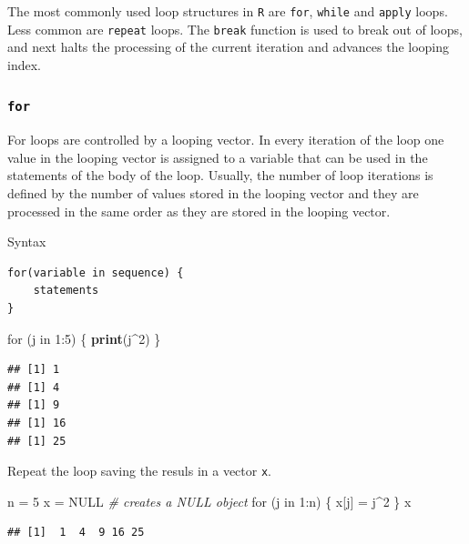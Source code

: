 \documentclass[]{article}
\newenvironment{Shaded}{\begin{snugshade}}{\end{snugshade}}
\newcommand{\KeywordTok}[1]{\textcolor[rgb]{0.13,0.29,0.53}{\textbf{{#1}}}}
\newcommand{\DecValTok}[1]{\textcolor[rgb]{0.00,0.00,0.81}{{#1}}}
\newcommand{\StringTok}[1]{\textcolor[rgb]{0.31,0.60,0.02}{{#1}}}
\newcommand{\CommentTok}[1]{\textcolor[rgb]{0.56,0.35,0.01}{\textit{{#1}}}}
\newcommand{\OtherTok}[1]{\textcolor[rgb]{0.56,0.35,0.01}{{#1}}}
\newcommand{\NormalTok}[1]{{#1}}
\numberwithin{equation}{section}
\begin{document}
The most commonly used loop structures in \texttt{R} are \texttt{for},
\texttt{while} and \texttt{apply} loops. Less common are \texttt{repeat}
loops. The \texttt{break} function is used to break out of loops, and
next halts the processing of the current iteration and advances the
looping index.

\subsubsection{\texorpdfstring{\texttt{for}}{for}}\label{for}

For loops are controlled by a looping vector. In every iteration of the
loop one value in the looping vector is assigned to a variable that can
be used in the statements of the body of the loop. Usually, the number
of loop iterations is defined by the number of values stored in the
looping vector and they are processed in the same order as they are
stored in the looping vector.

Syntax

\begin{verbatim}
for(variable in sequence) {
    statements
}
\end{verbatim}

\begin{Shaded}
\begin{Highlighting}[]
\NormalTok{for (j in }\DecValTok{1}\NormalTok{:}\DecValTok{5}\NormalTok{)}
\NormalTok{\{}
  \KeywordTok{print}\NormalTok{(j^}\DecValTok{2}\NormalTok{)}
\NormalTok{\}}
\end{Highlighting}
\end{Shaded}

\begin{verbatim}
## [1] 1
## [1] 4
## [1] 9
## [1] 16
## [1] 25
\end{verbatim}

Repeat the loop saving the resuls in a vector \texttt{x}.

\begin{Shaded}
\begin{Highlighting}[]
\NormalTok{n =}\StringTok{ }\DecValTok{5}
\NormalTok{x =}\StringTok{ }\OtherTok{NULL}  \CommentTok{# creates a NULL object}
\NormalTok{for (j in }\DecValTok{1}\NormalTok{:n)}
\NormalTok{\{}
  \NormalTok{x[j] =}\StringTok{ }\NormalTok{j^}\DecValTok{2}
\NormalTok{\}}
\NormalTok{x}
\end{Highlighting}
\end{Shaded}

\begin{verbatim}
## [1]  1  4  9 16 25
\end{verbatim}
\end{document}
